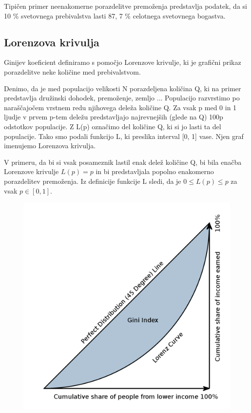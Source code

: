 \documentclass[a4paper,12 pt]{article}
\begin{document}
Tipičen primer neenakomerne porazdelitve premoženja predstavlja podatek, da si 10 \% svetovnega prebivalstva lasti 87, 7 \% celotnega svetovnega bogastva.

\subsection[Lorenzova krivulja]{Lorenzova krivulja}

Ginijev  koeficient  definiramo  s  pomočjo  Lorenzove  krivulje,  ki  je  grafični  prikaz porazdelitve neke količine med prebivalstvom.

Denimo,  da  je  med  populacijo  velikosti  N  porazdeljena  količina  Q,  ki  na  primer  predstavlja  družinski  dohodek,  premoženje,  zemljo  ...   Populacijo  razvrstimo po naraščajočem vrstnem redu njihovega deleža količine  Q.  Za vsak p med 0 in 1 ljudje v prvem p-tem deležu predstavljajo najrevnejših (glede na Q) 100p odstotkov populacije.   Z  L(p)  označimo  del  količine  Q,  ki  si  jo  lasti  ta  del  populacije. Tako smo podali funkcijo L, ki preslika interval [0, 1] vase. Njen graf imenujemo Lorenzova  krivulja. 

V primeru, da bi si vsak posameznik lastil enak delež količine Q, bi bila  enačba  Lorenzove  krivulje  $L(p)  =  p$  in  bi  predstavljala  popolno  enakomerno porazdelitev premoženja.  Iz definicije funkcije L sledi, da je $0 \leq L(p) \leq p$ za vsak $p \in [0, 1]$. 

\begin{figure}
\includegraphics[width= \linewidth]{./slike/lorenzova-krivulja.png}
\end{figure}
\end{document}
